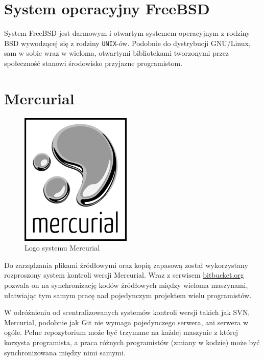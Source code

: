 \section{System operacyjny FreeBSD}
\par
System FreeBSD jest darmowym i otwartym systemem operacyjnym z rodziny BSD wywodzącej się z rodziny \texttt{UNIX}-ów. Podobnie do dystrybucji GNU/Linux, sam w sobie wraz w wieloma, otwartymi bibliotekami tworzonymi przez społeczność stanowi środowisko przyjazne programistom.

\section{Mercurial}
\begin{figure}
\begin{center}
\includegraphics[scale=0.50]{img/mercurial_logo.png}
\end{center}
\caption{Logo systemu Mercurial}
\end{figure}
\par
Do zarządzania plikami źródłowymi oraz kopią zapasową został wykorzystany rozproszony system kontroli wersji Mercurial. Wraz z serwisem \url{bitbucket.org} pozwala on na synchronizację kodów źródłowych między wieloma maszynami, ułatwiając tym samym pracę nad pojedynczym projektem wielu programistów.
\par
W odróżnieniu od scentralizowanych systemów kontroli wersji takich jak SVN, Mercurial, podobnie jak Git nie wymaga pojedynczego serwera, ani serwera w ogóle. Pełne repozytorium może być trzymane na każdej maszynie z której korzysta programista, a praca różnych programistów (zmiany w kodzie) może być synchronizowana między nimi samymi.

